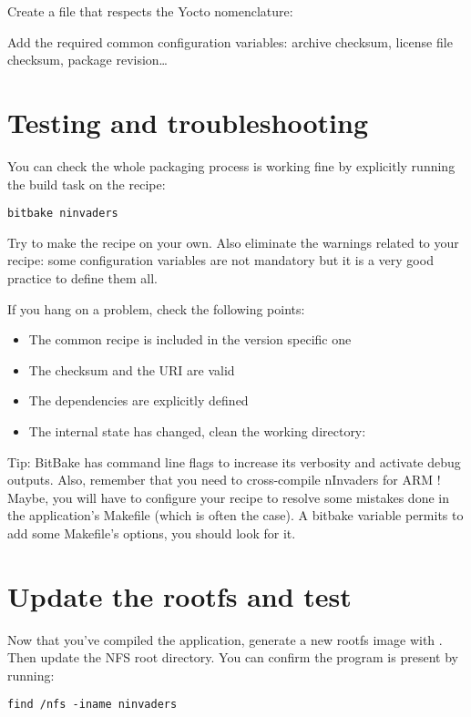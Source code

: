Create a file that respects the Yocto nomenclature: 

Add the required common configuration variables: archive checksum, license file
checksum, package revision\dots

\section{Testing and troubleshooting}

You can check the whole packaging process is working fine by explicitly running
the build task on the  recipe:
\begin{verbatim}
bitbake ninvaders
\end{verbatim}

Try to make the recipe on your own. Also eliminate the warnings related to your
recipe: some configuration variables are not mandatory but it is a very good
practice to define them all.

If you hang on a problem, check the following points:
\begin{itemize}
  \item The common recipe is included in the version specific one
  \item The checksum and the URI are valid
  \item The dependencies are explicitly defined
  \item The internal state has changed, clean the working directory: \\
\end{itemize}

Tip: BitBake has command line flags to increase its verbosity and activate debug
outputs. Also, remember that you need to cross-compile nInvaders for ARM ! Maybe,
you will have to configure your recipe to resolve some mistakes done in the
application's Makefile (which is often the case). A bitbake variable permits
to add some Makefile's options, you should look for it.

\section{Update the rootfs and test}

Now that you've compiled the  application, generate a new
rootfs image with . Then update the
NFS root directory. You can confirm the  program is
present by running:
\begin{verbatim}
find /nfs -iname ninvaders
\end{verbatim}

